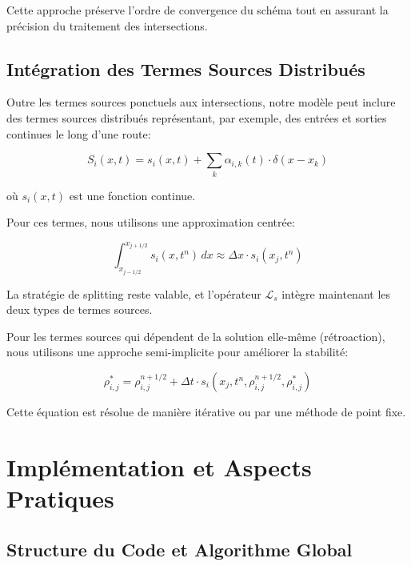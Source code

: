 Cette approche préserve l'ordre de convergence du schéma tout en assurant la précision du traitement des intersections.

\subsection{Intégration des Termes Sources Distribués}
\label{subsec:termes_sources}

Outre les termes sources ponctuels aux intersections, notre modèle peut inclure des termes sources distribués représentant, par exemple, des entrées et sorties continues le long d'une route:

\begin{equation}
S_i(x,t) = s_i(x,t) + \sum_k \alpha_{i,k}(t) \cdot \delta(x-x_k)
\end{equation}

où $s_i(x,t)$ est une fonction continue.

Pour ces termes, nous utilisons une approximation centrée:

\begin{equation}
\int_{x_{j-1/2}}^{x_{j+1/2}} s_i(x,t^n) \, dx \approx \Delta x \cdot s_i(x_j, t^n)
\end{equation}

La stratégie de splitting reste valable, et l'opérateur $\mathcal{L}_s$ intègre maintenant les deux types de termes sources.

Pour les termes sources qui dépendent de la solution elle-même (rétroaction), nous utilisons une approche semi-implicite pour améliorer la stabilité:

\begin{equation}
\rho_{i,j}^{*} = \rho_{i,j}^{n+1/2} + \Delta t \cdot s_i(x_j, t^n, \rho_{i,j}^{n+1/2}, \rho_{i,j}^{*})
\end{equation}

Cette équation est résolue de manière itérative ou par une méthode de point fixe.

\section{Implémentation et Aspects Pratiques}
\label{sec:implementation}

\subsection{Structure du Code et Algorithme Global}
\label{subsec:structure_code}

